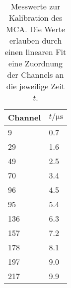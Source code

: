 \begin{table}
    \centering
    \begin{tabular}{@{}ll@{}}
    \toprule
     Channel & $t / \si{\micro\second}$  \\ \midrule
     \num{9}   &\num{0.7  }   \\
     \num{29}  &\num{1.6  }   \\
     \num{49}  &\num{2.5  }   \\
     \num{70}  &\num{3.4  }   \\
     \num{96}  &\num{4.5  }   \\
     \num{95}  &\num{5.4  }   \\
     \num{136} &\num{6.3  }   \\
     \num{157} &\num{7.2  }   \\
     \num{178} &\num{8.1  }   \\
     \num{197} &\num{9.0  }   \\
     \num{217} &\num{9.9  }   \\ \bottomrule
    \end{tabular}
    \caption{ Messwerte zur Kalibration des MCA. Die Werte erlauben durch einen linearen Fit eine Zuordnung der Channels an die jeweilige Zeit $t$.}
    \label{tab:kali}
\end{table} 
